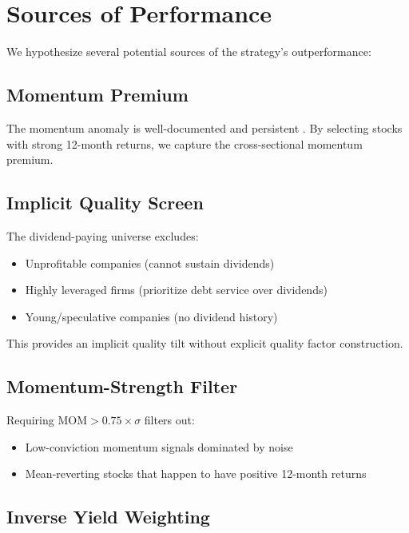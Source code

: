 \documentclass[12pt,a4paper]{article}
\theoremstyle{definition}
\begin{document}
\section{Sources of Performance}
\label{sec:performance}

We hypothesize several potential sources of the strategy's outperformance:

\subsection{Momentum Premium}

The momentum anomaly is well-documented and persistent \citep{jegadeesh1993returns}. By selecting stocks with strong 12-month returns, we capture the cross-sectional momentum premium.

\subsection{Implicit Quality Screen}

The dividend-paying universe excludes:
\begin{itemize}
    \item Unprofitable companies (cannot sustain dividends)
    \item Highly leveraged firms (prioritize debt service over dividends)
    \item Young/speculative companies (no dividend history)
\end{itemize}

This provides an implicit quality tilt without explicit quality factor construction.

\subsection{Momentum-Strength Filter}

Requiring $\text{MOM} > 0.75 \times \sigma$ filters out:
\begin{itemize}
    \item Low-conviction momentum signals dominated by noise
    \item Mean-reverting stocks that happen to have positive 12-month returns
\end{itemize}

\subsection{Inverse Yield Weighting}
\end{document}
